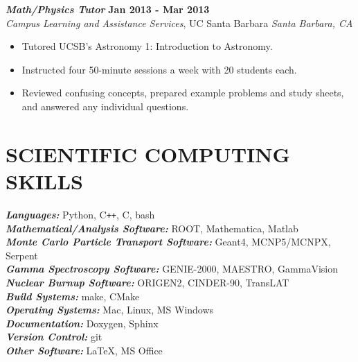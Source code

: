 \documentclass[margin, 10pt]{style/res} %
\begin{document}
\begin{resume}
{\sl\bf Math/Physics Tutor} \hfill {\bf Jan 2013 - Mar 2013} \\
{\sl Campus Learning and Assistance Services}, UC Santa Barbara \hfill {\sl Santa Barbara, CA} %
\vspace{2pt}
\begin{itemize}[leftmargin=4ex] \itemsep -2pt
\item Tutored UCSB's Astronomy 1: Introduction to Astronomy. 		
\item Instructed four 50-minute sessions a week with 20 students each.
\item Reviewed confusing concepts, prepared example problems and study sheets, and answered any individual questions.
\end{itemize} 







\section{\small{SCIENTIFIC COMPUTING \\ SKILLS}}

{\sl\bf Languages:} \hfill Python, C\verb!++!, C, bash\\
{\sl\bf Mathematical/Analysis Software:} \hfill ROOT, Mathematica, Matlab\\ %
{\sl\bf Monte Carlo Particle Transport Software:} \hfill Geant4, MCNP5/MCNPX, Serpent\\
{\sl\bf Gamma Spectroscopy Software:} \hfill GENIE-2000, MAESTRO, GammaVision\\
{\sl\bf Nuclear Burnup Software:} \hfill ORIGEN2, CINDER-90, TransLAT\\
{\sl\bf Build Systems:} \hfill make, CMake\\
{\sl\bf Operating Systems:} \hfill Mac, Linux, MS Windows\\
{\sl\bf Documentation:} \hfill Doxygen, Sphinx\\
{\sl\bf Version Control:} \hfill git\\
{\sl\bf Other Software:} \hfill \LaTeX, MS Office


\end{resume}
\end{document}
